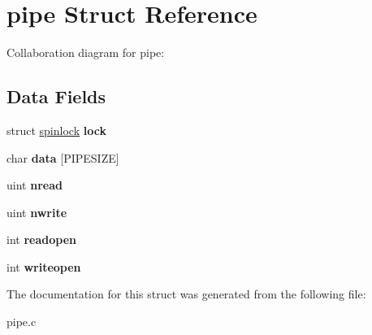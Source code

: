 \hypertarget{structpipe}{}\section{pipe Struct Reference}
\label{structpipe}


Collaboration diagram for pipe\+:
\subsection*{Data Fields}
\begin{DoxyCompactItemize}
\item 
struct \hyperlink{structspinlock}{spinlock} {\bfseries lock}\hypertarget{structpipe_a0ce399a2ba316d11cb8e678069bfd5b4}{}\label{structpipe_a0ce399a2ba316d11cb8e678069bfd5b4}

\item 
char {\bfseries data} \mbox{[}P\+I\+P\+E\+S\+I\+ZE\mbox{]}\hypertarget{structpipe_ab02ae9fa0b8b092512c28c7c080f0c7b}{}\label{structpipe_ab02ae9fa0b8b092512c28c7c080f0c7b}

\item 
uint {\bfseries nread}\hypertarget{structpipe_ad71eb56c445f9178dac07ae47f352fd1}{}\label{structpipe_ad71eb56c445f9178dac07ae47f352fd1}

\item 
uint {\bfseries nwrite}\hypertarget{structpipe_a419b6fc2780013358de51c91371dac66}{}\label{structpipe_a419b6fc2780013358de51c91371dac66}

\item 
int {\bfseries readopen}\hypertarget{structpipe_a7bdc57b39ef97dda61e468ad9e8dbfba}{}\label{structpipe_a7bdc57b39ef97dda61e468ad9e8dbfba}

\item 
int {\bfseries writeopen}\hypertarget{structpipe_a9538da698ddd63615c991a318094663b}{}\label{structpipe_a9538da698ddd63615c991a318094663b}

\end{DoxyCompactItemize}


The documentation for this struct was generated from the following file\+:\begin{DoxyCompactItemize}
\item 
pipe.\+c\end{DoxyCompactItemize}

